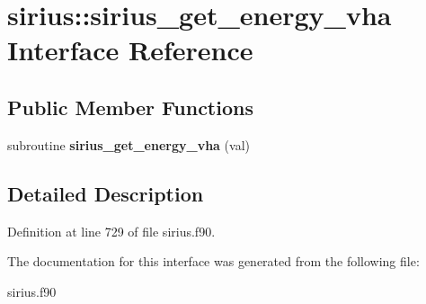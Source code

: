 \hypertarget{interfacesirius_1_1sirius__get__energy__vha}{}\section{sirius\+:\+:sirius\+\_\+get\+\_\+energy\+\_\+vha Interface Reference}
\label{interfacesirius_1_1sirius__get__energy__vha}
\subsection*{Public Member Functions}
\begin{DoxyCompactItemize}
\item 
\hypertarget{interfacesirius_1_1sirius__get__energy__vha_afe83bb90f0174d36dba634f60d54aa74}{}subroutine {\bfseries sirius\+\_\+get\+\_\+energy\+\_\+vha} (val)\label{interfacesirius_1_1sirius__get__energy__vha_afe83bb90f0174d36dba634f60d54aa74}

\end{DoxyCompactItemize}


\subsection{Detailed Description}


Definition at line 729 of file sirius.\+f90.



The documentation for this interface was generated from the following file\+:\begin{DoxyCompactItemize}
\item 
sirius.\+f90\end{DoxyCompactItemize}
